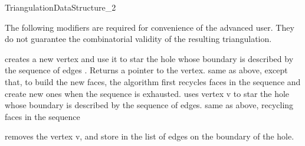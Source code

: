 \begin{ccRefConcept}{TriangulationDataStructure_2}
\begin{ccAdvanced}
The following modifiers are required for convenience of the advanced
user.
They do not guarantee the combinatorial validity 
of the resulting triangulation.

{creates a new vertex  and use it to star the hole 
whose boundary is described  by the sequence of edges \ccc{[edge_begin, 
edge_end[}. Returns a pointer to the  vertex.}
\ccGlue 
{}
{ same as above, except that, to build the new faces, the  algorithm 
first recycles faces in the sequence \ccc{[face_begin, 
face_end[} and create new ones when the sequence is exhausted.}
\ccGlue
{}
{uses vertex v to  star the hole 
whose boundary is described  by the sequence of edges\ccc{[edge_begin, 
edge_end[}.
}
\ccGlue
{}
{same as above, recycling faces in the sequence  \ccc{[face_begin, 
face_end[ . } }

\ccGlue
{}
{removes the vertex v, and store in  the list of edges
on the boundary of the hole.}


\end{ccAdvanced}
\end{ccRefConcept}

